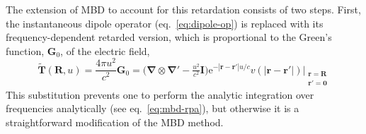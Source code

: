 The extension of MBD to account for this retardation consists of two steps.
First, the instantaneous dipole operator (eq.~\ref{eq:dipole-op}) is replaced with its frequency-dependent retarded version, which is proportional to the Green's function, $\boldsymbol G_0$, of the electric field,
\begin{equation}
  \tilde{\mathbf T}(\mathbf R,u)=\frac{4\pi u^2}{c^2}\boldsymbol G_0=\big(\boldsymbol\nabla\otimes\boldsymbol\nabla'-\tfrac{u^2}{c^2}\mathbf I\big)\mathrm e^{-|\mathbf r-\mathbf r'|u/c}v(|\mathbf r-\mathbf r'|)\Big|_{\substack{\mathbf r=\mathbf R\\\mathbf r'=\mathbf 0}}
  \label{eq:green-maxwell}
\end{equation}
This substitution prevents one to perform the analytic integration over frequencies analytically (see eq.~\ref{eq:mbd-rpa}), but otherwise it is a straightforward modification of the MBD method.

